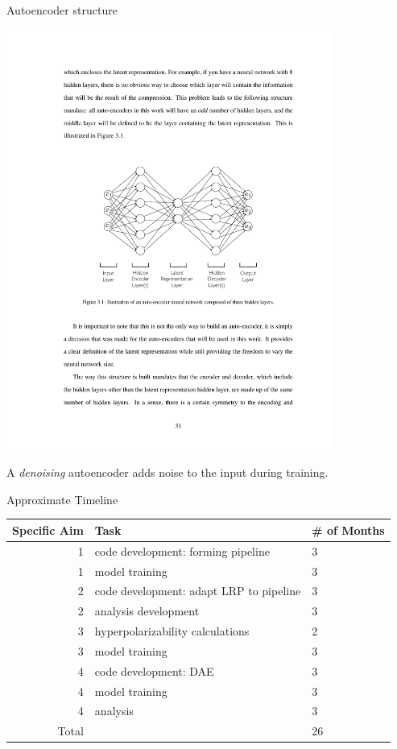 \documentclass[xetex,compress]{beamer}
\begin{document}
\begin{frame}{Autoencoder structure}
  \begin{center}
    \includegraphics[width=0.80\textwidth]{./figures/autoencoder.pdf}
  \end{center}
  A \textit{denoising} autoencoder adds noise to the input during training.
\end{frame}

\begin{frame}{Approximate Timeline}
\begin{table}[]
\centering
\begin{tabular}{@{}rp{}l@{}}
\toprule
Specific Aim & Task                                    & \# of Months \\ \midrule
1            & code development: forming pipeline      & 3            \\
1            & model training                          & 3            \\
2            & code development: adapt LRP to pipeline & 3            \\
2            & analysis development                    & 3            \\
3            & hyperpolarizability calculations        & 2            \\
3            & model training                          & 3            \\
4            & code development: DAE                   & 3            \\
4            & model training                          & 3            \\
4            & analysis                                & 3            \\ \midrule
Total        &                                         & 26           \\ \bottomrule
\end{tabular}
\end{table}\end{frame}
\end{document}
